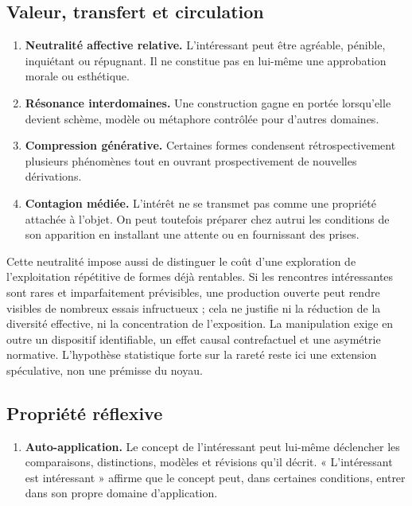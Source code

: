 \documentclass[11pt,a4paper]{article}
\begin{document}
\subsection{Valeur, transfert et circulation}

\begin{enumerate}[resume]
  \item \textbf{Neutralité affective relative.} L'intéressant peut être
        agréable, pénible, inquiétant ou répugnant. Il ne constitue pas en
        lui-même une approbation morale ou esthétique.
  \item \textbf{Résonance interdomaines.} Une construction gagne en portée
        lorsqu'elle devient schème, modèle ou métaphore contrôlée pour d'autres
        domaines.
  \item \textbf{Compression générative.} Certaines formes condensent
        rétrospectivement plusieurs phénomènes tout en ouvrant prospectivement
        de nouvelles dérivations.
  \item \textbf{Contagion médiée.} L'intérêt ne se transmet pas comme une
        propriété attachée à l'objet. On peut toutefois préparer chez autrui les
        conditions de son apparition en installant une attente ou en fournissant
        des prises.
\end{enumerate}

Cette neutralité impose aussi de distinguer le coût d'une exploration de
l'exploitation répétitive de formes déjà rentables. Si les rencontres
intéressantes sont rares et imparfaitement prévisibles, une production ouverte
peut rendre visibles de nombreux essais infructueux ; cela ne justifie ni la
réduction de la diversité effective, ni la concentration de l'exposition. La
manipulation exige en outre un dispositif identifiable, un effet causal
contrefactuel et une asymétrie normative. L'hypothèse statistique forte sur la
rareté reste ici une extension spéculative, non une prémisse du noyau.

\subsection{Propriété réflexive}

\begin{enumerate}[resume]
  \item \textbf{Auto-application.} Le concept de l'intéressant peut lui-même
        déclencher les comparaisons, distinctions, modèles et révisions qu'il
        décrit. « L'intéressant est intéressant » affirme que le concept peut,
        dans certaines conditions, entrer dans son propre domaine
        d'application.
\end{enumerate}
\end{document}
